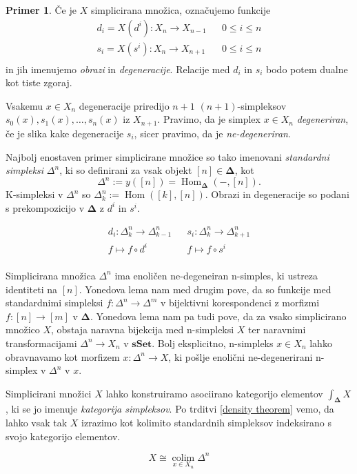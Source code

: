 \documentclass[12pt,a4paper]{book}
\theoremstyle{definition}
\theoremstyle{plain}
\theoremstyle{definition}
\newtheorem{primer}{Primer}[section]
\theoremstyle{remark}
\newcommand{\cat}[1]{\textbf{#1}}
\DeclareMathOperator{\Hom}{Hom}
\DeclareMathOperator{\colim}{colim}
\begin{document}
\begin{primer}
Če je $X$ simplicirana množica, označujemo funkcije
\begin{align*}
d_i = X(d^i) : X_n \to X_{n-1} & & 0 \leq i \leq n \\
s_i = X(s^i) : X_n \to X_{n+1} & & 0 \leq i \leq n \\
\end{align*}
in jih imenujemo \emph{obrazi} in \emph{degeneracije}. Relacije med $d_i$ in $s_i$ bodo potem dualne kot tiste zgoraj. 


Vsakemu $x \in X_n$ degeneracije priredijo $n+1$ $(n+1)$-simpleksov $s_0(x), s_1(x), \ldots , s_n(x)$ iz  $X_{n+1}$. Pravimo, da je simplex $x \in X_n$ \emph{degeneriran}, če je slika kake degeneracije $s_i$, sicer pravimo, da je \emph{ne-degeneriran}.


Najbolj enostaven primer simplicirane množice so tako imenovani \emph{standardni simpleksi} $\Delta^n$, ki so definirani za vsak objekt $[n] \in \mathbf{\Delta}$, kot
$$\Delta^n := y([n]) = \Hom_{\mathbf{\Delta}}(-,[n]).$$
K-simpleksi v $\Delta^n$ so $\Delta_k^n := \Hom([k], [n])$. Obrazi in degeneracije so podani s prekompozicijo v $\mathbf{\Delta}$ z $d^i$ in $s^i$.

\begin{align*}
d_i : \Delta_k^n \to \Delta_{k-1}^n & & s_i : \Delta_k^n \to \Delta_{k+1}^n \\
f \mapsto f \circ d^i & & f \mapsto f \circ s^i \\
\end{align*}

Simplicirana množica $\Delta^n$ ima enoličen ne-degeneiran n-simples, ki ustreza identiteti na $[n]$. Yonedova lema nam med drugim pove, da so funkcije med standardnimi simpleksi $f : \Delta^n \to \Delta^m$ v bijektivni korespondenci z morfizmi $f : [n] \to [m]$ v $\mathbf{\Delta}$. Yonedova lema nam pa tudi pove, da za vsako simplicirano množico $X$, obstaja naravna bijekcija med n-simpleksi $X$ ter naravnimi transformacijami $\Delta^n \to X_n$ v $\cat{sSet}$. Bolj eksplicitno, n-simpleks $x \in X_n$ lahko obravnavamo kot morfizem $x : \Delta^n \to X$, ki pošlje enolični ne-degenerirani n-simplex v $\Delta^n$ v $x$.


Simplicirani množici $X$ lahko konstruiramo asociirano kategorijo elementov $\int_{\mathbf{\Delta}}X$, ki se jo imenuje \emph{kategorija simpleksov}. Po trditvi \ref{density theorem} vemo, da lahko vsak tak $X$ izrazimo kot kolimito standardnih simpleksov indeksirano s svojo kategorijo elementov.

$$X \cong \underset{x \in X_n}{\colim}\Delta^n$$



\end{primer}
\end{document}
